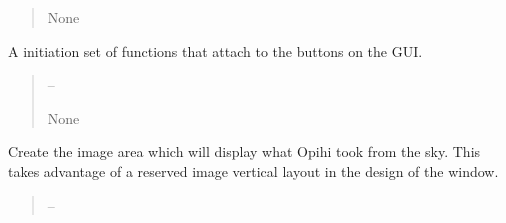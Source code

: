 \documentclass[letterpaper,11pt,english]{sphinxmanual}
\begin{document}
\begin{savenotes}
\begin{fulllineitems}
\begin{savenotes}
\begin{fulllineitems}
\begin{quote}
\begin{description}
\begin{itemize}
\end{itemize}

\sphinxAtStartPar
None

\end{description}\end{quote}

\end{fulllineitems}\end{savenotes}


\begin{savenotes}\begin{fulllineitems}
\label{\detokenize{code/opihiexarata.gui.selector:opihiexarata.gui.selector.TargetSelectorWindow.__init_gui_connections}}
\pysigstartsignatures
{}
\pysigstopsignatures
\sphinxAtStartPar
A initiation set of functions that attach to the buttons on the
GUI.
\begin{quote}\begin{description}
\sphinxAtStartPar
{} – 

\sphinxAtStartPar
None

\end{description}\end{quote}

\end{fulllineitems}\end{savenotes}


\begin{savenotes}\begin{fulllineitems}
\label{\detokenize{code/opihiexarata.gui.selector:opihiexarata.gui.selector.TargetSelectorWindow.__init_opihi_image}}
\pysigstartsignatures
{}
\pysigstopsignatures
\sphinxAtStartPar
Create the image area which will display what Opihi took from the
sky. This takes advantage of a reserved image vertical layout in the
design of the window.
\begin{quote}\begin{description}
\sphinxAtStartPar
{} – 


\end{description}
\end{quote}
\end{fulllineitems}
\end{savenotes}
\end{fulllineitems}
\end{savenotes}
\end{document}
